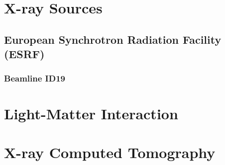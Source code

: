 \section{X-ray Sources}
\label{sec:sources}

\subsection{European Synchrotron Radiation Facility (ESRF)}
\label{sec:esrf}

\subsubsection{Beamline ID19}
\label{sec:id19}

\section{Light-Matter Interaction}
\label{sec:light-matter}

\section{X-ray Computed Tomography}
\label{sec:xray-ct}